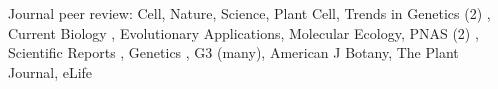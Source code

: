 \documentclass[letterpaper,10pt]{article}
\newcommand{\ignore}[1]{}
\renewenvironment{itemize}{
  \begin{list}{}{
    \setlength{\leftmargin}{1.5em}
  }
}{
  \end{list}
}
\begin{document}
\begin{itemize}
\item Journal peer review:  \ignore{2/20} Cell, \ignore{1/21} Nature,  \ignore{10/23} Science,    \ignore{2/22} Plant Cell,  Trends in Genetics (2) \ignore{9/21, 6/21}, Current Biology \ignore{3/21}, \ignore{9/23} Evolutionary Applications, \ignore{3/21} Molecular Ecology, PNAS (2) \ignore{7/21,1/22}, Scientific Reports \ignore{3/2021}, Genetics \ignore{1/21},  G3 (many), \ignore{8/2021} American J Botany, \ignore{1/21} The Plant Journal, \ignore{2/22} eLife
\end{itemize}

\end{document}
